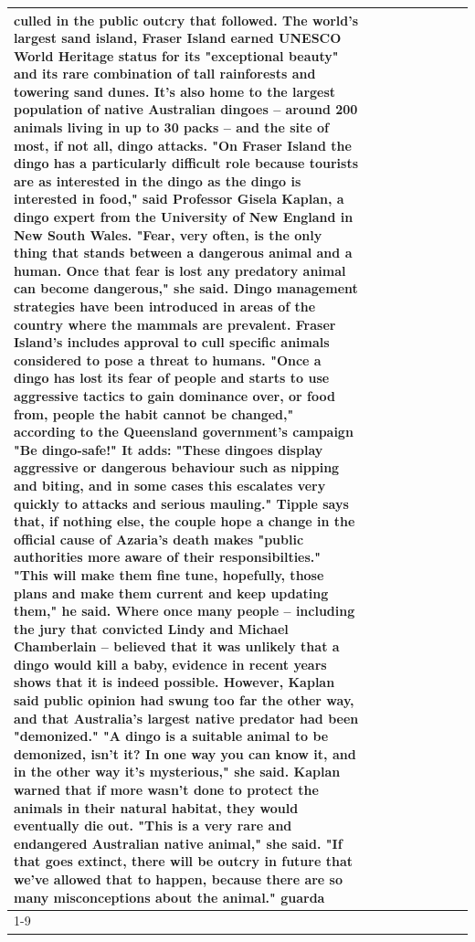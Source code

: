 \begin{table}[H]
\begin{tabular}{lllrlllll}
culled in the public outcry that followed. The world's largest sand island, Fraser Island earned UNESCO World Heritage status for its "exceptional beauty" and its rare combination of tall rainforests and towering sand dunes. It's also home to the largest population of native Australian dingoes -- around 200 animals living in up to 30 packs -- and the site of most, if not all, dingo attacks. "On Fraser Island the dingo has a particularly difficult role because tourists are as interested in the dingo as the dingo is interested in food," said Professor Gisela Kaplan, a dingo expert from the University of New England in New South Wales. "Fear, very often, is the only thing that stands between a dangerous animal and a human. Once that fear is lost any predatory animal can become dangerous," she said. Dingo management strategies have been introduced in areas of the country where the mammals are prevalent. Fraser Island's includes approval to cull specific animals considered to pose a threat to humans. "Once a dingo has lost its fear of people and starts to use aggressive tactics to gain dominance over, or food from, people the habit cannot be changed," according to the Queensland government's campaign "Be dingo-safe!" It adds: "These dingoes display aggressive or dangerous behaviour such as nipping and biting, and in some cases this escalates very quickly to attacks and serious mauling." Tipple says that, if nothing else, the couple hope a change in the official cause of Azaria's death makes "public authorities more aware of their responsibilties." "This will make them fine tune, hopefully, those plans and make them current and keep updating them," he said. Where once many people -- including the jury that convicted Lindy and Michael Chamberlain -- believed that it was unlikely that a dingo would kill a baby, evidence in recent years shows that it is indeed possible. However, Kaplan said public opinion had swung too far the other way, and that Australia's largest native predator had been "demonized." "A dingo is a suitable animal to be demonized, isn't it? In one way you can know it, and in the other way it's mysterious," she said. Kaplan warned that if more wasn't done to protect the animals in their natural habitat, they would eventually die out. "This is a very rare and endangered Australian native animal," she said. "If that goes extinct, there will be outcry in future that we've allowed that to happen, because there are so many misconceptions about the animal." guarda \\
\cline{1-9}

\end{tabular}
\end{table}

